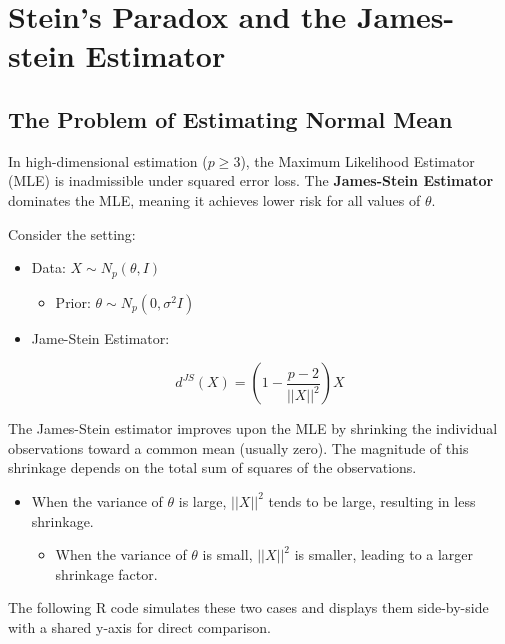 \documentclass[
  letterpaper,
  DIV=11,
  numbers=noendperiod]{scrreprt}
\providecommand{\tightlist}{%
  \setlength{\itemsep}{0pt}\setlength{\parskip}{0pt}}
\renewcommand{\[}{\begin{equation}}
\renewcommand{\]}{\end{equation}}
\theoremstyle{definition}
\theoremstyle{plain}
\theoremstyle{plain}
\theoremstyle{plain}
\theoremstyle{definition}
\theoremstyle{plain}
\theoremstyle{remark}
\begin{document}
\section{Stein's Paradox and the James-stein
Estimator}\label{steins-paradox-and-the-james-stein-estimator}

\subsection{The Problem of Estimating Normal
Mean}\label{the-problem-of-estimating-normal-mean}

In high-dimensional estimation (\(p \ge 3\)), the Maximum Likelihood
Estimator (MLE) is inadmissible under squared error loss. The
\textbf{James-Stein Estimator} dominates the MLE, meaning it achieves
lower risk for all values of \(\theta\).

Consider the setting:

\begin{itemize}
\tightlist
\item
  Data: \(X \sim N_p(\theta, I)\)

  \begin{itemize}
  \tightlist
  \item
    Prior: \(\theta \sim N_p(0, \sigma^2 I)\)
  \end{itemize}
\item
  Jame-Stein Estimator:
\end{itemize}

\[d^{JS}(X) = \left( 1 - \frac{p-2}{||X||^2} \right) X\]

The James-Stein estimator improves upon the MLE by shrinking the
individual observations toward a common mean (usually zero). The
magnitude of this shrinkage depends on the total sum of squares of the
observations.

\begin{itemize}
\tightlist
\item
  When the variance of \(\theta\) is large, \(||X||^2\) tends to be
  large, resulting in less shrinkage.

  \begin{itemize}
  \tightlist
  \item
    When the variance of \(\theta\) is small, \(||X||^2\) is smaller,
    leading to a larger shrinkage factor.
  \end{itemize}
\end{itemize}

The following R code simulates these two cases and displays them
side-by-side with a shared y-axis for direct comparison.
\end{document}
